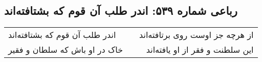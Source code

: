 \begin{center}
\section*{رباعی شماره ۵۳۹: اندر طلب آن قوم که بشتافته‌اند}
\label{sec:0539}
\begin{longtable}{l p{0.5cm} r}
اندر طلب آن قوم که بشتافته‌اند
&&
از هرچه جز اوست روی برتافته‌اند
\\
خاک در او باش که سلطان و فقیر
&&
این سلطنت و فقر از او یافته‌اند
\\
\end{longtable}
\end{center}
